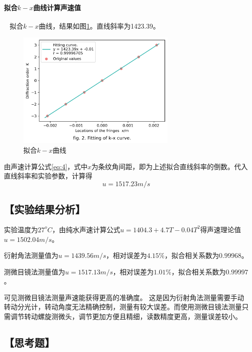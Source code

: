 \documentclass[12pt,a4paper,UTF8]{ctexart}
\begin{document}
		\paragraph{拟合$k-x$曲线计算声速值}~
		\newline
		\indent
		拟合$k-x$曲线，结果如图\ref{fig:2}。直线斜率为1423.39。
		\begin{figure}[htbp]
			\centering
			\includegraphics[width=0.7\textwidth]{attachments/fig.2.png}
			\caption{拟合$k-x$曲线}
			\label{fig:2}
		\end{figure}
		
		由声速计算公式\ref{eq:4}，式中$x$为条纹角间距，即为上述拟合直线斜率的倒数。代入直线斜率和实验参数，计算得
		$$
		u = 1517.23 m/s
		$$
\subsection*{【实验结果分析】}
实验温度为$27^oC$，由纯水声速计算公式$u = 1404.3 + 4.7T - 0.04T^2$\cite{LUBBERS19981065}得声速理论值$u = 1502.04 m/s$。

衍射角法测量值为$u = 1439.56 m/s$，相对误差为$4.15\%$，拟合相关系数为$0.99968$。

测微目镜法测量值为$u = 1517.13 m/s$，相对误差为$1.01\%$，拟合相关系数为$0.99997$。

可见测微目镜法测量声速能获得更高的准确度。
这是因为衍射角法测量需要手动转动分光计，转动角度无法精确控制，测量有较大误差。而使用测微目镜法测量只需调节转动螺旋测微头，调节更加方便且精细，读数精度更高，测量误差较小。
\printbibliography[title=参考文献] %

\newpage
\subsection*{【思考题】}
\end{document}

